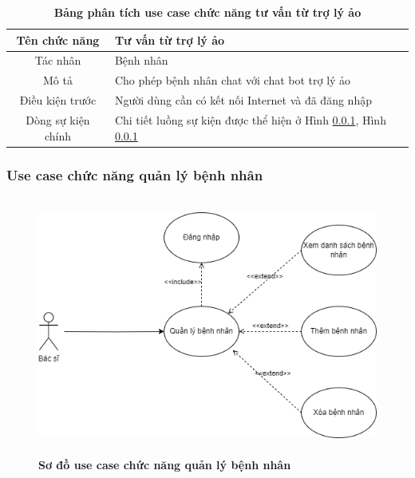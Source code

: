   \begin{table}[H]
    \caption{\bfseries \fontsize{12pt}{0pt}\selectfont Bảng phân tích use case chức năng tư vấn từ trợ lý ảo}
    \centering
    \begin{tabularx}{0.9\textwidth}{|c|X|}
      \hline
      \textbf{Tên chức năng} & \textbf{Tư vấn từ trợ lý ảo} \\
      \hline
      Tác nhân & Bệnh nhân \\
      \hline
      Mô tả & Cho phép bệnh nhân chat với chat bot trợ lý ảo \\
      \hline
      Điều kiện trước & Người dùng cần có kết nối Internet và đã đăng nhập \\
      \hline
      Dòng sự kiện chính & 
        Chi tiết luồng sự kiện được thể hiện ở Hình \ref{}, Hình \ref{} 
        \\
      \hline
    \end{tabularx}
  \end{table}  

\subsubsection{Use case chức năng quản lý bệnh nhân}
  \begin{figure}[H]
    \centering
    \includegraphics[width=14.2cm,height=8.5cm]{Images/use_case/use_case_manage_patients.png}
    \caption[Sơ đồ use case chức năng quản lý bệnh nhân]{\bfseries \fontsize{12pt}{0pt}
    \selectfont Sơ đồ use case chức năng quản lý bệnh nhân}
    \label{use_case_patient_management} %
  \end{figure}

